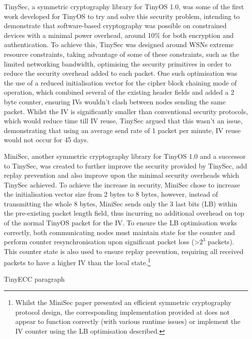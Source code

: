 \documentclass[conference]{./sty/IEEEtran}
\begin{document}
TinySec\cite{TinySec}, a symmetric cryptography library for TinyOS 1.0, was some of the first work developed for TinyOS to try and solve this security problem, intending to demonstrate that software-based cryptography was possible on constrained devices with a minimal power overhead, around 10\% for both encryption and authentication. To achieve this, TinySec was designed around WSNs extreme resource constraints, taking advantage of some of these constraints, such as the limited networking bandwidth, optimising the security primitives in order to reduce the security overhead added to each packet. One such optimisation was the use of a reduced initialisation vector for the cipher block chaining mode of operation, which combined several of the existing header fields and added a 2 byte counter, ensuring IVs wouldn't clash between nodes sending the same packet. Whilst the IV is significantly smaller than conventional security protocols, which would reduce time till IV reuse, TinySec argued that this wasn't an issue, demonstrating that using an average send rate of 1 packet per minute, IV reuse would not occur for 45 days.

MiniSec, another symmetric cryptography library for TinyOS 1.0 and a successor to TinySec, was created to further improve the security provided by TinySec, add replay prevention and also improve upon the minimal security overheads which TinySec achieved. To achieve the increase in security, MiniSec chose to increase the initialisation vector size from 2 bytes to 8 bytes, however, instead of transmitting the whole 8 bytes, MiniSec sends only the 3 last bits (LB) within the pre-existing packet length field, thus incurring no additional overhead on top of the normal TinyOS packet for the IV. To ensure the LB optimisation works correctly, both communicating nodes must maintain state for the counter and perform counter resynchronisation upon significant packet loss (\textgreater$2^3$ packets). This counter state is also used to ensure replay prevention, requiring all received packets to have a higher IV than the local state.\footnote{Whilst the MiniSec paper presented an efficient symmetric cryptography protocol design, the corresponding implementation provided at \cite{MiniSecLink} does not appear to function correctly (with various runtime issues) or implement the IV counter using the LB optimisation described.}

TinyECC paragraph \cite{TinyECC}
\end{document}
